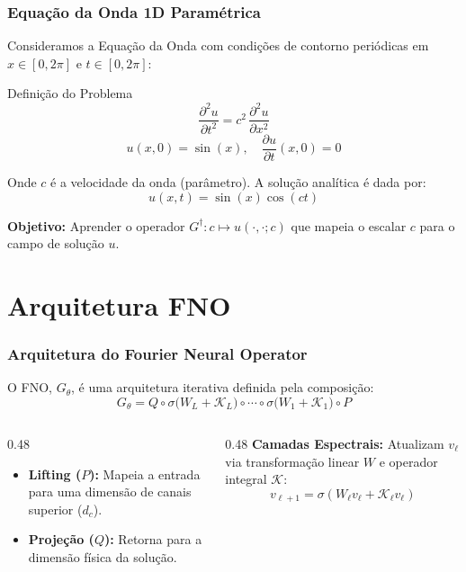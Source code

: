 \documentclass[usenames,dvipsnames,brazil,aspectratio=169]{beamer}
\begin{document}
\begin{frame}[t]
    \frametitle{Equação da Onda 1D Paramétrica}
    Consideramos a Equação da Onda com condições de contorno periódicas em $x \in [0, 2\pi]$ e $t \in [0, 2\pi]$:

    \begin{block}{Definição do Problema}
        $$ \frac{\partial^2 u}{\partial t^2} = c^2\,\frac{\partial^2 u}{\partial x^2} $$
        \vspace{-0.3cm}
        $$ u(x,0) = \sin(x), \quad \frac{\partial u}{\partial t}(x,0) = 0 $$
    \end{block}

    Onde $c$ é a velocidade da onda (parâmetro). A solução analítica é dada por:
    $$ u(x,t) = \sin(x)\cos(c t) $$

    \textbf{Objetivo:} Aprender o operador $G^\dagger : c \mapsto u(\cdot, \cdot; c)$ que mapeia o escalar $c$ para o campo de solução $u$.
\end{frame}

\section{Arquitetura FNO}

\begin{frame}[t]
    \frametitle{Arquitetura do Fourier Neural Operator}
    O FNO, $G_\theta$, é uma arquitetura iterativa definida pela composição:
    $$ G_\theta = Q \circ \sigma\Big(W_L + \mathcal{K}_L\Big) \circ \cdots \circ \sigma\Big(W_1 + \mathcal{K}_1\Big) \circ P $$

    \begin{columns}[T]
        \begin{column}{0.48\textwidth}
            \begin{itemize}
                \item \textbf{Lifting ($P$):} Mapeia a entrada para uma dimensão de canais superior ($d_c$).
                \item \textbf{Projeção ($Q$):} Retorna para a dimensão física da solução.
            \end{itemize}
        \end{column}
        \begin{column}{0.48\textwidth}
             \textbf{Camadas Espectrais:}
             Atualizam $v_\ell$ via transformação linear $W$ e operador integral $\mathcal{K}$:
             $$ v_{\ell+1} = \sigma ( W_\ell v_\ell + \mathcal{K}_\ell v_\ell ) $$
        \end{column}
    \end{columns}
\end{frame}
\end{document}
